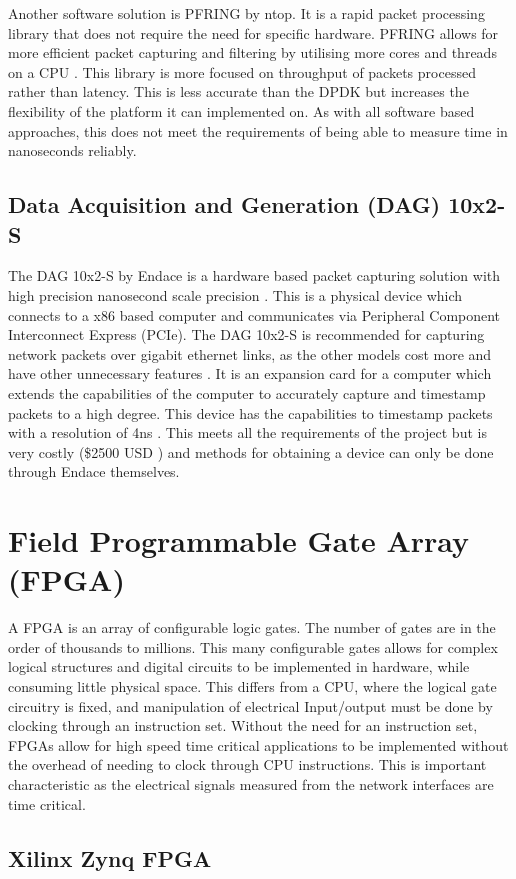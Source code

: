 Another software solution is PF\textunderscore RING by ntop\texttrademark. 
It is a rapid packet processing library that does not require the need for specific hardware.  
PF\textunderscore RING allows for more efficient packet capturing and filtering by utilising more cores and threads on a CPU \cite{pfringworks}.
This library is more focused on throughput of packets processed rather than latency. 
This is less accurate than the DPDK but increases the flexibility of the platform it can implemented on. 
As with all software based approaches, this does not meet the requirements of being able to measure time in nanoseconds reliably.

\subsection{Data Acquisition and Generation (DAG) 10x2-S}

The DAG 10x2-S by Endace is a hardware based packet capturing solution with high precision nanosecond scale precision \cite{dagprecision}. 
This is a physical device which connects to a x86 based computer and communicates via Peripheral Component Interconnect Express (PCIe). 
The DAG 10x2-S is recommended for capturing network packets over gigabit ethernet links, as the other models cost more and have other unnecessary features \cite{dagfeatures}.
It is an expansion card for a computer which extends the capabilities of the computer to accurately capture and timestamp packets to a high degree. 
This device has the capabilities to timestamp packets with a resolution of 4ns \cite{dagprecision}. 
This meets all the requirements of the project but is very costly (\$2500 USD \cite{dagprice}) and methods for obtaining a device can only be done through Endace themselves. 

\section{Field Programmable Gate Array (FPGA)}

A FPGA is an array of configurable logic gates. The number of gates are in the order of thousands to
millions. This many configurable gates allows for complex logical structures and digital circuits to be
implemented in hardware, while consuming little physical space. This differs from a CPU, where the
logical gate circuitry is fixed, and manipulation of electrical Input/output must be done by clocking
through an instruction set. Without the need for an instruction set, FPGAs allow for high speed time
critical applications to be implemented without the overhead of needing to clock through CPU
instructions. This is important characteristic as the electrical signals measured from the network
interfaces are time critical.

\subsection{Xilinx Zynq FPGA}


